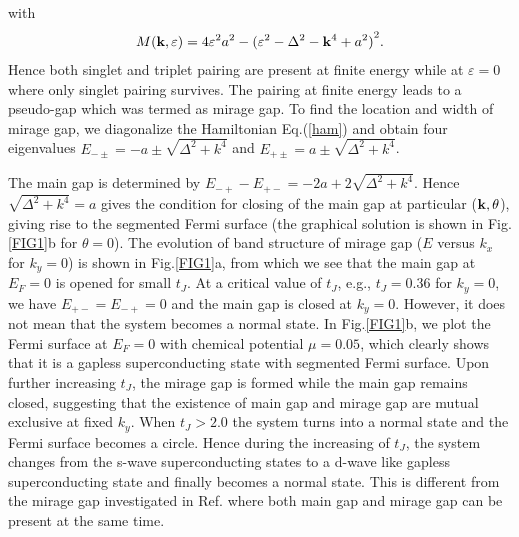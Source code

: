 \documentclass[aps, prb, twocolumn, amssymb, amsmath, showpacs, superscriptaddress]{revtex4-1}
\begin{document}
with
\begin{align}
M( \textbf{k},\varepsilon  )=4{{\varepsilon }^{2}}a^2 -{{( {{\varepsilon }^{2}}-{{\Delta }^{2}}- {{\bf k}^{4}} +a^2 )}^{2}}.
\end{align}
Hence both singlet and triplet pairing are present at finite energy while at $\varepsilon=0$ where only singlet pairing survives. The pairing at finite energy leads to a pseudo-gap which was termed as mirage gap\cite{GM-Tang}. To find the location and width of mirage gap, we diagonalize the Hamiltonian Eq.(\ref{ham}) and obtain four eigenvalues $E_{- \pm} = - a \pm \sqrt{\Delta^2 +k^4}$ and $E_{+\pm} =  a \pm \sqrt{\Delta^2 +k^4}$.

The main gap is determined by $E_{-+} - E_{+-} = -2a + 2\sqrt{\Delta^2 +k^4}$. Hence $\sqrt{\Delta^2 +k^4}=a$ gives the condition for closing of the main gap at particular (${\bf k}, \theta$), giving rise to the segmented Fermi surface (the graphical solution is shown in Fig.\ref{FIG1}b for $\theta=0$).
The evolution of band structure of mirage gap ($E$ versus $k_x$ for $k_y=0$) is shown in Fig.\ref{FIG1}a, from which we see that the main gap at $E_F=0$ is opened for small $t_J$. At a critical value of $t_J$, e.g., $t_J=0.36$ for $k_y=0$, we have $E_{+-}=E_{-+}=0$ and the main gap is closed at $k_y=0$. However, it does not mean that the system becomes a normal state. In Fig.\ref{FIG1}b, we plot the Fermi surface at $E_F=0$ with chemical potential $\mu=0.05$, which clearly shows that it is a gapless superconducting state with segmented Fermi surface\cite{L-Fu1}.
Upon further increasing $t_J$, the mirage gap is formed while the main gap remains closed, suggesting that the existence of main gap and mirage gap are mutual exclusive at fixed $k_y$. When $t_J>2.0$ the system turns into a normal state and the Fermi surface becomes a circle. Hence during the increasing of $t_J$, the system changes from the s-wave superconducting states to a d-wave like gapless superconducting state and finally becomes a normal state.
This
is different from the mirage gap investigated in Ref. where both main gap and mirage gap can be present at the same time.
\end{document}
